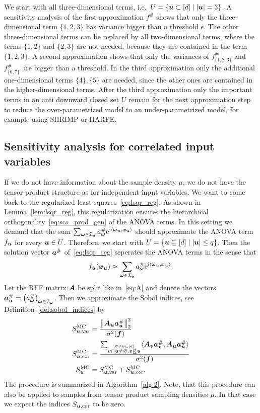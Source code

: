 \documentclass{article}
\renewcommand{\vec}[1]{\ensuremath \mathbf{\boldsymbol{#1}}}
\newcommand{\w}{\ensuremath{\vec \omega}}
\newcommand{\x}{\ensuremath{\vec x}}
\newcommand{\I}{\ensuremath{\mathcal{I}}}
\newcommand{\e}{\mathrm{e}}
\newcommand{\im}{\mathrm{i}}
\newcommand{\norm}[1]{\left\lVert {#1} \right\rVert}    %
\theoremstyle{definition}
\numberwithin{equation}{section}
\begin{document}
We start with all three-dimensional terms, i.e.~$U = \{\vec u\subset [d]\mid |\vec u| = 3\}$. A sensitivity analysis of the first approximation $f^\#$ shows that only the three-dimensional term $\{1,2,3\}$ has variance bigger than a threshold $\epsilon$. The other three-dimensional terms can be replaced by all two-dimensional terms, where the terms $\{1,2\}$ and $\{2,3\}$ are not needed, because they are contained in the term $\{1,2,3\}$. A second approximation shows that only the variances of $f^\#_{\{1,2,3\}}$ and $f^\#_{\{6,7\}}$ are bigger than a threshold. In the third approximation only the additional one-dimensional terms $\{4\}, \{5\}$ are needed, since the other ones are contained in the higher-dimensional terms. After the third approximation only the important terms in an anti downward closed set $U$ remain for the next approximation step to reduce the over-parametrized model to an under-parametrized model, for example using SHRIMP or HARFE.



\subsection{Sensitivity analysis for correlated input variables}
\label{sec:gsi2}
If we do not have information about the sample density $\mu$, we do not have the tensor product structure as for independent input variables. 
We want to come back to the regularized least squares~\eqref{eq:lsqr_reg}. As shown in Lemma~\ref{lem:lsqr_reg}, this regularization ensures the hierarchical
orthogonality~\eqref{eq:sca_prod_gen} of the ANOVA terms. In this setting we demand that the 
sum $\sum_{\w\in \I_{\vec u}} a_{\w}^\# \e^{\im \langle \w_{\vec u},\x_{\vec u}\rangle}$ should approximate the ANOVA term $f_{\vec u}$ for every $\vec u\in U$.
Therefore, we start with $U = \{\vec u\subseteq [d]\mid |\vec u|\leq q\}$. Then the solution vector $\vec a^\#$ of~\eqref{eq:lsqr_reg} seperates the ANOVA terms in the sense that 
$$f_{\vec u}(\x_{\vec u}) \approx \sum_{\w\in \I_{\vec u}} a_{\w}^\# \e^{\im \langle \w_{\vec u},\x_{\vec u}\rangle}.$$
Let the RFF matrix $\vec A$ be split like in~\eqref{eq:A} and denote the vectors $\vec a^{\#}_{\vec u} = \left(a^{\#}_\w\right)_{\w \in \I_{\w}}$. Then we approximate the Sobol indices, see Definition~\ref{def:sobol_indices} by
\begin{align}\label{eq:sobol_num1}
S^{\text{MC}}_{\vec u,\text{var}} &=\frac{\norm{\vec A_{\vec u}\vec a^\#_{\vec u}}_2^2}{\sigma^2(\vec f)} \\
S^{\text{MC}}_{\vec u,\text{cor}} &=\frac{\sum_{\stackrel{\varnothing \neq \vec v \subseteq [d]}{\vec v\cap \vec u\neq \varnothing, \vec v\not\subseteq \vec u}} \langle \vec A_{\vec v} \vec a^\#_{\vec v}, \vec A_{\vec u} \vec a^\#_{\vec u} \rangle}{\sigma^2(\vec f)} \label{eq:sobol_num2}\\
S^{\text{MC}}_{\vec u} &=S^{\text{MC}}_{\vec u,\text{var}} +S^{\text{MC}}_{\vec u,\text{cor}}.\label{eq:sobol_num3}
\end{align}
The procedure is summarized in Algorithm~\ref{alg:2}. Note, that this procedure can also be applied to samples from tensor product sampling densities $\mu$. In that case we expect the indices $S_{\vec u,\text{cor}}$ to be zero.
\end{document}
